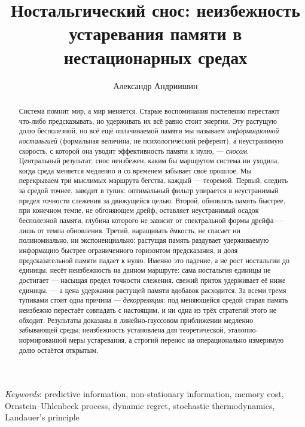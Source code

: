 \documentclass[12pt]{iopart}
\begin{document}
\title[Ностальгический снос]{Ностальгический снос: неизбежность устаревания памяти в нестационарных средах}

\author{Александр Андриишин}

\address{Независимый исследователь; ORCID 0009-0000-4739-4017; alexander@andriishin.com}

\begin{abstract}
Система помнит мир, а мир меняется. Старые воспоминания постепенно перестают что-либо предсказывать, но удерживать их всё равно стоит энергии. Эту растущую долю бесполезной, но всё ещё оплачиваемой памяти мы называем \emph{информационной ностальгией} (формальная величина, не психологический референт), а неустранимую скорость, с которой она уводит эффективность памяти к нулю, --- \emph{сносом}. Центральный результат: снос неизбежен, каким бы маршрутом система ни уходила, когда среда меняется медленно и со временем забывает своё прошлое. Мы перекрываем три мыслимых маршрута бегства, каждый --- теоремой. Первый, следить за средой точнее, заводит в тупик: оптимальный фильтр упирается в неустранимый предел точности слежения за движущейся целью. Второй, обновлять память быстрее, при конечном темпе, не обгоняющем дрейф, оставляет неустранимый осадок бесполезной памяти, глубина которого не зависит от спектральной формы дрейфа --- лишь от темпа обновления. Третий, наращивать ёмкость, не спасает ни полиномиально, ни экспоненциально: растущая память раздувает удерживаемую информацию быстрее ограниченного горизонтом предсказания, и доля предсказательной памяти падает к нулю. Именно это падение, а не рост ностальгии до единицы, несёт неизбежность на данном маршруте: сама ностальгия единицы не достигает --- насыщая предел точности слежения, свежий приток удерживает её ниже единицы, --- а цена удержания растущей памяти вдобавок расходится. За всеми тремя тупиками стоит одна причина --- \emph{декорреляция}: под меняющейся средой старая память неизбежно перестаёт совпадать с настоящим, и ни одна из трёх стратегий этого не обходит. Результаты доказаны в линейно-гауссовом приближении медленно забывающей среды; неизбежность установлена для теоретической, эталонно-нормированной меры устаревания, а строгий перенос на операционально измеримую долю остаётся открытым.
\end{abstract}

\medskip\noindent\textit{Keywords}: predictive information, non-stationary information, memory cost, Ornstein–Uhlenbeck process, dynamic regret, stochastic thermodynamics, Landauer's principle
\end{document}
